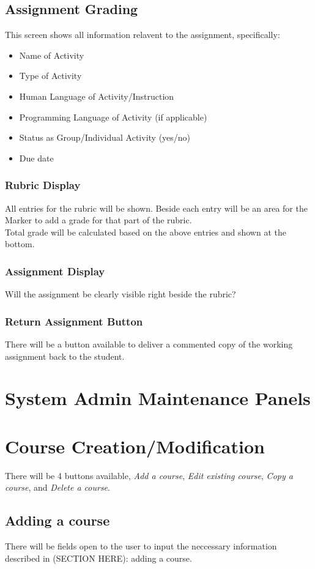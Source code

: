 \documentclass{article}
\begin{document}
\subsection{Assignment Grading}
This screen shows all information relavent to the assignment, specifically:
\begin{itemize}
  \item Name of Activity
  \item Type of Activity
  \item Human Language of Activity/Instruction
  \item Programming Language of Activity (if applicable)
  \item Status as Group/Individual Activity (yes/no)
  \item Due date
\end{itemize}
\subsubsection{Rubric Display}
All entries for the rubric will be shown. Beside each entry will be an
area for the Marker to add a grade for that part of the rubric.\\
Total grade will be calculated based on the above entries and shown at the
bottom.
\subsubsection{Assignment Display}
Will the assignment be clearly visible right beside the rubric?
\subsubsection{Return Assignment Button}
There will be a button available to deliver a commented copy of the working
assignment back to the student.

\section{System Admin Maintenance Panels}

\section{Course Creation/Modification}
There will be 4 buttons available, \emph{Add a course}, \emph{Edit existing course},
\emph{Copy a course}, and \emph{Delete a course}.

\subsection{Adding a course}
There will be fields open to the user to input the neccessary information described
in (SECTION HERE): adding a course.
\end{document}
